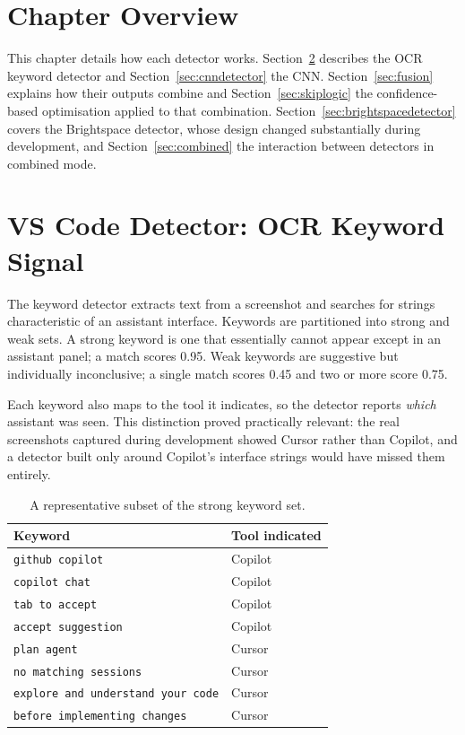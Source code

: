 \documentclass[12pt,oneside]{report}
\newcommand{\code}[1]{\texttt{\small #1}}
\begin{document}
\section{Chapter Overview}

This chapter details how each detector works.
Section~\ref{sec:ocrdetector} describes the OCR keyword detector and
Section~\ref{sec:cnndetector} the CNN. Section~\ref{sec:fusion} explains how
their outputs combine and Section~\ref{sec:skiplogic} the confidence-based
optimisation applied to that combination.
Section~\ref{sec:brightspacedetector} covers the Brightspace detector, whose
design changed substantially during development, and
Section~\ref{sec:combined} the interaction between detectors in combined mode.

\section{VS Code Detector: OCR Keyword Signal}
\label{sec:ocrdetector}

The keyword detector extracts text from a screenshot and searches for strings
characteristic of an assistant interface. Keywords are partitioned into strong
and weak sets. A strong keyword is one that essentially cannot appear except in
an assistant panel; a match scores 0.95. Weak keywords are suggestive but
individually inconclusive; a single match scores 0.45 and two or more score
0.75.

Each keyword also maps to the tool it indicates, so the detector reports
\emph{which} assistant was seen. This distinction proved practically relevant:
the real screenshots captured during development showed Cursor rather than
Copilot, and a detector built only around Copilot's interface strings would
have missed them entirely.

\begin{table}[h]
\centering
\caption{A representative subset of the strong keyword set.}
\begin{tabular}{@{}ll@{}}
\toprule
\textbf{Keyword} & \textbf{Tool indicated} \\
\midrule
\code{github copilot} & Copilot \\
\code{copilot chat} & Copilot \\
\code{tab to accept} & Copilot \\
\code{accept suggestion} & Copilot \\
\code{plan agent} & Cursor \\
\code{no matching sessions} & Cursor \\
\code{explore and understand your code} & Cursor \\
\code{before implementing changes} & Cursor \\
\bottomrule
\end{tabular}
\end{table}
\end{document}
